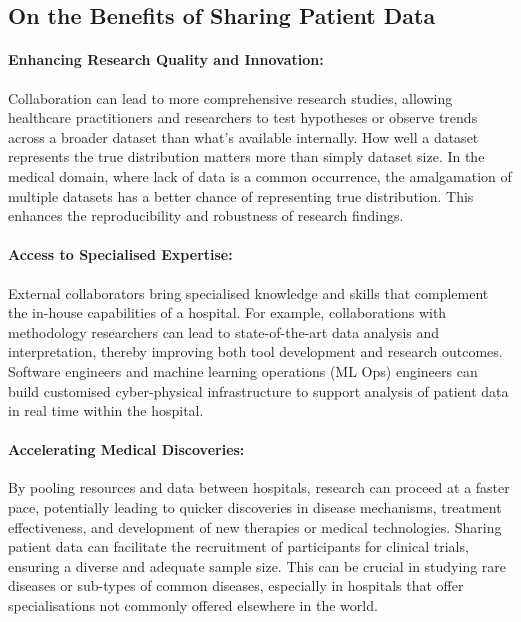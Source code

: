 \documentclass[11pt]{article}
\begin{document}
\subsection{On the Benefits of Sharing Patient Data}

\paragraph{Enhancing Research Quality and Innovation:} 
Collaboration can lead to more comprehensive research studies, allowing healthcare practitioners and researchers to test hypotheses or observe trends across a broader dataset than what's available internally. How well a dataset represents the true distribution matters more than simply dataset size\cite{app11020796}. In the medical domain, where lack of data is a common occurrence, the amalgamation of multiple datasets has a better chance of representing true distribution. This enhances the reproducibility and robustness of research findings.

\paragraph{Access to Specialised Expertise:} 
External collaborators bring specialised knowledge and skills that complement the in-house capabilities of a hospital. For example, collaborations with methodology researchers can lead to state-of-the-art data analysis and interpretation, thereby improving both tool development and research outcomes. Software engineers and machine learning operations (ML Ops) engineers can build customised cyber-physical infrastructure to support analysis of patient data in real time within the hospital\cite{harris2022}.

\paragraph{Accelerating Medical Discoveries:}
By pooling resources and data between hospitals, research can proceed at a faster pace\cite{app11020796}, potentially leading to quicker discoveries in disease mechanisms, treatment effectiveness, and development of new therapies or medical technologies. Sharing patient data can facilitate the recruitment of participants for clinical trials, ensuring a diverse and adequate sample size. This can be crucial in studying rare diseases or sub-types of common diseases, especially in hospitals that offer specialisations not commonly offered elsewhere in the world. 
\end{document}

